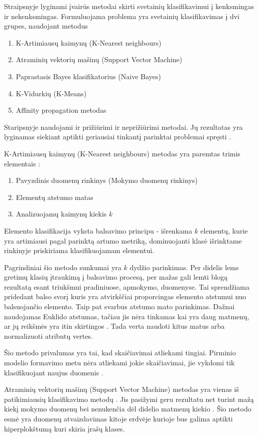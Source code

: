 Straipsnyje lyginami įvairūs metodai skirti svetainių klasifikavimui į kenksmingas ir nekenksmingas. Formuluojama problema yra svetainių klasifikavimas į dvi grupes, naudojant metodus \cite{comp}
\begin{enumerate}
 \item K-Artimiausų kaimynų (K-Nearest neighbours)
 \item Atraminių vektorių mašinų (Support Vector Machine)
 \item Paprastasis Bayes klasifikatorius (Naive Bayes)
 \item K-Vidurkių (K-Means)
 \item Affinity propagation metodas
\end{enumerate}

Staripsnyje naudojami ir prižiūrimi ir neprižiūrimi metodai. Jų rezultatas yra lyginamas siekiant aptikti geriausiai tinkantį parinktai problemai spręsti \cite{comp}.

K-Artimiausų kaimynų (K-Nearest neighbours) metodas yra paremtas trimis elementais \cite{Wu2008}:
\begin{enumerate}
    \item Pavyzdinis duomenų rinkinys (Mokymo duomenų rinkinys)
    \item Elementų atstumo matas
    \item Analizuojamų kaimynų kiekis $k$
\end{enumerate}
Elemento klasifikacija vyksta balsavimo principu - išrenkama $k$ elementų, kurie yra artimiausi pagal parinktą artumo metriką, dominuojanti klasė išrinktame rinkinyje priskiriama klasifikuojamam elementui.

Pagrindiniai šio metodo sunkumai yra $k$ dydžio parinkimas. Per didelis lems gretimų klasių įtraukimą į balsavimo procesą, per mažas gali lemti blogą rezultatą esant triukšmui pradiniuose, apmokymo, duomenyse. Tai sprendžiama pridedant balso svorį \cite{Wu2008} kuris yra atvirkščiai proporcingas elemento atstumui nuo balsuojančio elemento. Taip pat svarbus atstumo mato parinkimas. Dažnai naudojamas Euklido atstumas, tačiau jis nėra tinkamas kai yra daug matmenų, ar jų reikšmės yra itin skirtingos \cite{Wu2008}. Tada verta naudoti kitus matus arba normalizuoti atributų vertes.

Šio metodo privalumas yra tai,  kad skaičiavimai atliekami tingiai. Pirminio modelio formavimo metu nėra atliekami jokie skaičiavimai, jie vykdomi tik klasifikuojant naujus duomenis \cite{Wu2008}.

Atraminių vektorių mašinų (Support Vector Machine) metodas yra vienas iš patikimiausių klasifikavimo metodų \cite{Wu2008}. Jis pasižymi geru rezultatu net turint mažą kiekį mokymo duomenų bei nenukenčia dėl didelio matmenų kiekio \cite{Wu2008}. Šio metodo esmė yra duomenų atvaizdavimas kitoje erdvėje kurioje bus galima aptikti hiperplokštumą kuri skiria įrašų klases.

